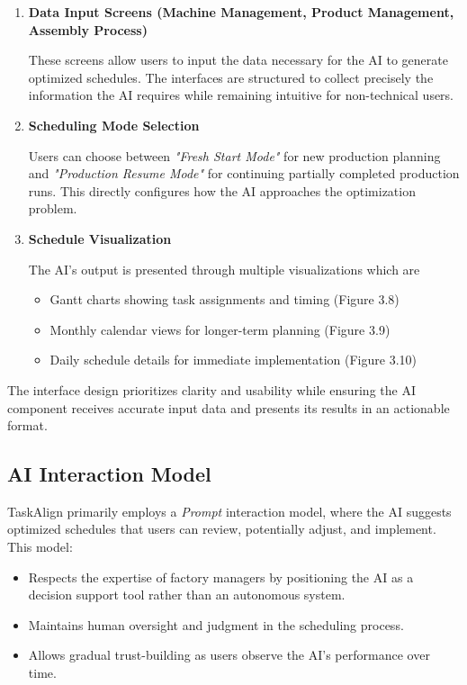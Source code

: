\begin{enumerate}
    \item \textbf{Data Input Screens (Machine Management, Product Management, Assembly Process)}
 
    These screens allow users to input the data necessary for the AI to generate optimized schedules. The interfaces are structured to collect precisely the information the AI requires while remaining intuitive for non-technical users.
    
    \item \textbf{Scheduling Mode Selection}
    
    Users can choose between \textit{"Fresh Start Mode"} for new production planning and \textit{"Production Resume Mode"} for continuing partially completed production runs. This directly configures how the AI approaches the optimization problem.
    
    \item \textbf{Schedule Visualization}
    
    The AI's output is presented through multiple visualizations which are
    \begin{itemize}
        \item Gantt charts showing task assignments and timing (Figure 3.8)
        \item Monthly calendar views for longer-term planning (Figure 3.9)
        \item Daily schedule details for immediate implementation (Figure 3.10)
    \end{itemize}
    
\end{enumerate}

The interface design prioritizes clarity and usability while ensuring the AI component receives accurate input data and presents its results in an actionable format.

\subsection{AI Interaction Model}

TaskAlign primarily employs a \textit{Prompt} interaction model, where the AI suggests optimized schedules that users can review, potentially adjust, and implement. This model:
\begin{itemize}[nosep,leftmargin=*,topsep=2pt, partopsep=0pt, itemsep=1pt]
    \item Respects the expertise of factory managers by positioning the AI as a decision support tool rather than an autonomous system.
    \item Maintains human oversight and judgment in the scheduling process.
    \item Allows gradual trust-building as users observe the AI's performance over time.
\end{itemize}


